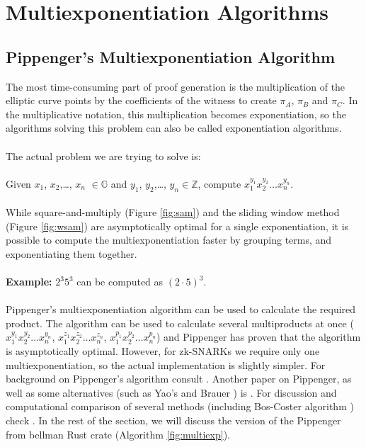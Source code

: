 \section{Multiexponentiation Algorithms}

\subsection{Pippenger's Multiexponentiation Algorithm}
The most time-consuming part of proof generation is the multiplication of the elliptic curve points by the coefficients of the witness to create $\pi_A$, $\pi_B$ and $\pi_C$. In the multiplicative notation, this multiplication becomes exponentiation, so the algorithms solving this problem can also be called exponentiation algorithms.\\
\\
The actual problem we are trying to solve is:\\
\\
Given $x_1$, $x_2$,\dots, $x_n$ $\in \mathbb{G}$ and $y_1$, $y_2$,\dots, $y_n \in \mathbb{Z}$, compute $x_1^{y_1} x_2^{y_2} \dots x_n^{y_n}$.\\
\\
While square-and-multiply (Figure \ref{fig:sam}) and the sliding window method (Figure \ref{fig:wsam}) are asymptotically optimal for a single exponentiation, it is possible to compute the multiexponentiation faster by grouping terms, and exponentiating them together.\\
\\
\textbf{Example:} $2^3 5^3$ can be computed as $(2 \cdot 5)^3$.\\
\\
Pippenger's multiexponentiation algorithm \cite{pippenger1976evaluation} can be used to calculate the required product. The algorithm can be used to calculate several multiproducts at once ($x_1^{y_1} x_2^{y_2} \dots x_n^{y_n}$, $x_1^{z_1} x_2^{z_2} \dots x_n^{z_n}$, $x_1^{p_1} x_2^{p_2} \dots x_n^{p_n}$) and Pippenger has proven that the algorithm is asymptotically optimal. However, for zk-SNARKs we require only one multiexponentiation, so the actual implementation is slightly simpler. For background on Pippenger's algorithm consult \cite{henry2010pippenger}. Another paper on Pippenger, as well as some alternatives (such as Yao's \cite{yao1976evaluation} and Brauer \cite{brauer1939addition}) is \cite{bernstein2002pippenger3s}. For discussion and computational comparison of several methods (including Bos-Coster algorithm \cite{bos1989addition}) check \cite{bergeron1994efficient}. In the rest of the section, we will discuss the version of the Pippenger from bellman Rust crate (Algorithm \ref{fig:multiexp}).
